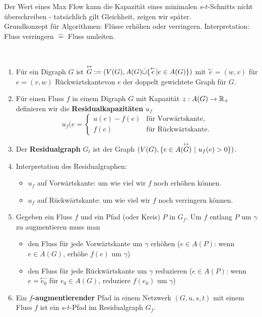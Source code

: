 Der Wert eines Max Flow kann die Kapazität eines minimalen $s$-$t$-Schnitts nicht überschreiben - tatsächlich gilt Gleichheit, zeigen wir später.\\[5pt]
Grundkonzept für Algorithmen: Flüsse erhöhen oder verringern. Interpretation: Fluss verringern $\widehat{=}$ Fluss umleiten.
\begin{definition}~
	\begin{enumerate}[1)]
		\item Für ein Digraph $G$ ist $\overset{\leftrightarrow}{G} := (V(G), A(G) \dot\cup \{\overset{\leftarrow}{e} \vert e \in A(G)\})$ mit $\overset{\leftarrow}{e} = (w,v)$ für $e=(v,w)$ \dq Rückwärtskante\dq von $e$ der doppelt gewichtete Graph für $G$.
		\item Für einen Fluss $f$ in einem Digraph $G$ mit Kapazität $z:A(G)\to \mathbb{R}_+$ definieren wir die \textbf{Residualkapazitäten} $u_f$ \[ u_f(e = \begin{cases} u(e) - f(e) &\text{für Vorwärtskante,}\\ f(e) &\text{für Rückwärtskante.} \end{cases} \]
		\item Der \textbf{Residualgraph} $G_t$ ist der Graph $(V(G), \{e\in A(\overset{\leftrightarrow}{G})~\vert~ u_f(e) > 0\})$.
		\item Interpretation des Residualgraphen:
		\begin{itemize}
			\item $u_f$ auf Vorwärtskante: um wie viel wir $f$ noch erhöhen können.
			\item $u_f$ auf Rückwärtskante: um wie viel wir $f$ noch verringern können.
		\end{itemize}
	\item Gegeben ein Fluss $f$ und ein Pfad (oder Kreis) $P$ in $G_f$. Um $f$ entlang $P$ um $\gamma$ zu augmentieren muss man
	\begin{itemize}
		\item den Fluss für jede Vorwärtskante um $\gamma$ erhöhen ($e\in A(P)$: wenn $e \in A(G)$, erhöhe $f(e)$ um $\gamma$)
		\item den Fluss für jede Rückwärtskante um $\gamma$ reduzieren ($e \in A(P)$: wenn $e = \overset{\leftarrow}{e_0}$ für $e_0 \in A(G)$, reduziere $f(e_0)$ um $\gamma$)
	\end{itemize}
	\item Ein \textbf{$f$-augmentierender} Pfad in einem Netzwerk $(G, u, s, t)$ mit einem Fluss $f$ ist ein $s$-$t$-Pfad im Residualgraph $G_f$.
	\end{enumerate}
\end{definition}
